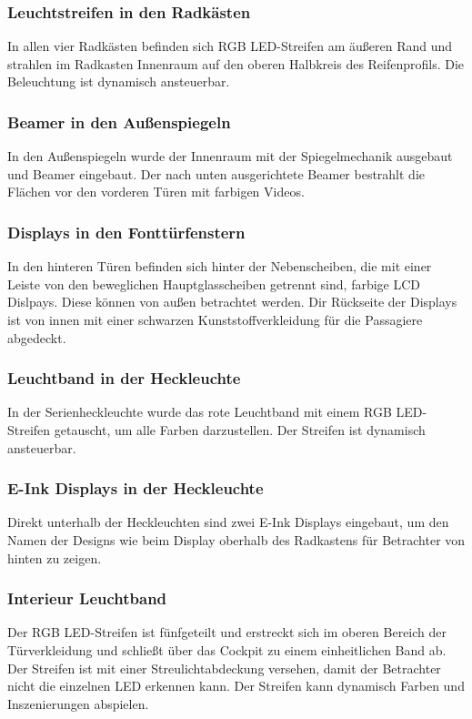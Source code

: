 \subsubsection{Leuchtstreifen in den Radkästen}
In allen vier Radkästen befinden sich RGB LED-Streifen am äußeren Rand und strahlen im Radkasten Innenraum auf den oberen Halbkreis des Reifenprofils. Die Beleuchtung ist dynamisch ansteuerbar.
\subsubsection{Beamer in den Außenspiegeln}
In den Außenspiegeln wurde der Innenraum mit der Spiegelmechanik ausgebaut und Beamer eingebaut. Der nach unten ausgerichtete Beamer bestrahlt die Flächen vor den vorderen Türen mit farbigen Videos.
\subsubsection{Displays in den Fonttürfenstern}
In den hinteren Türen befinden sich hinter der Nebenscheiben, die mit einer Leiste von den beweglichen Hauptglasscheiben getrennt sind, farbige LCD Dislpays. Diese können von außen betrachtet werden. Dir Rückseite der Displays ist von innen mit einer schwarzen Kunststoffverkleidung für die Passagiere abgedeckt.
\subsubsection{Leuchtband in der Heckleuchte}
In der Serienheckleuchte wurde das rote Leuchtband mit einem RGB LED-Streifen getauscht, um alle Farben darzustellen. Der Streifen ist dynamisch ansteuerbar.
\subsubsection{E-Ink Displays in der Heckleuchte}
Direkt unterhalb der Heckleuchten sind zwei E-Ink Displays eingebaut, um den Namen der Designs wie beim Display oberhalb des Radkastens für Betrachter von hinten zu zeigen.
\subsubsection{Interieur Leuchtband}
Der RGB LED-Streifen ist fünfgeteilt und erstreckt sich im oberen Bereich der Türverkleidung und schließt über das Cockpit zu einem einheitlichen Band ab. Der Streifen ist mit einer Streulichtabdeckung versehen, damit der Betrachter nicht die einzelnen LED erkennen kann. Der Streifen kann dynamisch Farben und Inszenierungen abspielen.
